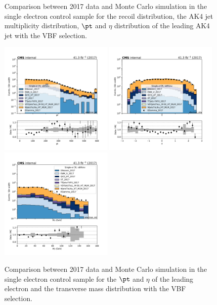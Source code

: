 {\begin{figure}[htbp]
\begin{center}
    \end{center}
    \caption{Comparison between 2017 data and Monte Carlo simulation in the single electron control sample for
        the recoil distribution, the AK4 jet multiplicity distribution,  $\pt$ and $\eta$ distribution
        of the leading AK4 jet with the VBF selection.}
    \label{fig:SE_vbfhinv_2017}
\end{figure}

\begin{figure}[htbp]
    \begin{center}
        \includegraphics[width=0.49\textwidth]{fig/datamc/cr_1e_vbf/cr_1e_vbf_electron_pt_losf_2017.pdf}
        \includegraphics[width=0.49\textwidth]{fig/datamc/cr_1e_vbf/cr_1e_vbf_electron_eta_losf_2017.pdf} \\
        \includegraphics[width=0.49\textwidth]{fig/datamc/cr_1e_vbf/cr_1e_vbf_electron_mt_losf_2017.pdf}
    \end{center}
    \caption{Comparison between 2017 data and Monte Carlo simulation in the single electron control sample for
        the $\pt$ and $\eta$ of the leading electron and the transverse mass distribution with the VBF selection.}
    \label{fig:SE_2_vbfhinv_2017}
\end{figure}

}
